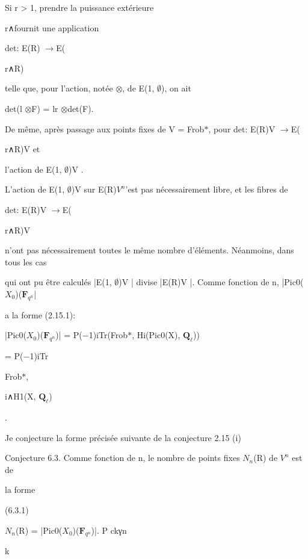 \documentclass[11pt]{article}
\begin{document}
\noindent Si r > 1, prendre la puissance extérieure\par
\noindent r∧fournit une application\par
\noindent det: E(R) \(\to\)E(\par
\noindent r∧R)\par
\noindent telle que, pour l’action, notée \(\otimes\), de E(1, \(\emptyset\)), on ait\par
\noindent det(l \(\otimes\)F) = lr \(\otimes\)det(F).\par
\noindent De même, après passage aux points fixes de V = Frob\(*\), pour det: E(R)V \(\to\)E(\par
\noindent r∧R)V et\par
\noindent l’action de E(1, \(\emptyset\))V .\par
\noindent L’action de E(1, \(\emptyset\))V sur E(R)\(V^n\)’est pas nécessairement libre, et les fibres de\par
\noindent det: E(R)V \(\to\)E(\par
\noindent r∧R)V\par
\noindent n’ont pas nécessairement toutes le même nombre d’éléments. Néanmoins, dans tous les cas\par
\noindent qui ont pu être calculés |E(1, \(\emptyset\))V | divise |E(R)V |. Comme fonction de n, |Pic0(\(X_0\))(\(\mathbf F_{q^n}\)|\par
\noindent a la forme (2.15.1):\par
\noindent |Pic0(\(X_0\))(\(\mathbf F_{q^n}\))| = P(−1)iTr(Frob\(*\), Hi(Pic0(X), \(\mathbf Q_{\ell}\)))\par
\noindent = P(−1)iTr\par
\noindent \par
\noindent Frob\(*\),\par
\noindent i∧H1(X, \(\mathbf Q_{\ell}\))\par
\noindent \par
\noindent .\par
\noindent Je conjecture la forme précisée suivante de la conjecture 2.15 (i)\par
\medskip
\noindent Conjecture 6.3. Comme fonction de n, le nombre de points fixes \(N_n\)(R) de \(V^n\) est de\par
\noindent la forme\par
\noindent (6.3.1)\par
\noindent \(N_n\)(R) = |Pic0(\(X_0\))(\(\mathbf F_{q^n}\))|. P ckγn\par
\noindent k\par
\end{document}
